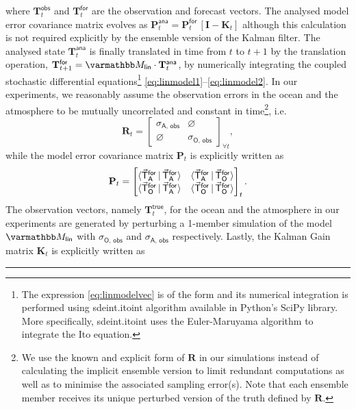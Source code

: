 \documentclass[a4paper,10pt]{article}
\begin{document}
\begin{multicols}{2}
{\noindent}where $\mathbf{T}_t^\mathsf{obs}$ and $\mathbf{T}_t^\mathsf{for}$ are the observation and forecast vectors. The analysed model error covariance matrix evolves as $\mathbf{P}_t^\mathsf{ana} = \mathbf{P}_t^\mathsf{for}\,[\mathbf{I} - \mathbf{K}_t]$ although this calculation is not required explicitly by the ensemble version of the Kalman filter. The analysed state $\mathbf{T}_t^\mathsf{ana}$ is finally translated in time from $t$ to $t + 1$ by the translation operation, $\mathbf{T}_{t+1}^\mathsf{for} = \mlin \cdot \mathbf{T}_{t}^\mathsf{ana}$, by numerically integrating the coupled stochastic differential equations\footnote{The expression \eqref{eq:linmodelvec} is of the  form and its numerical integration is performed using \textsf{sdeint}.\textsf{itoint} algorithm available in Python's \textsf{SciPy} library. More specifically, \textsf{sdeint}.\textsf{itoint} uses the Euler-Maruyama algorithm to integrate the Ito equation.}  \eqref{eq:linmodel1}--\eqref{eq:linmodel2}. In our experiments, we reasonably assume the observation errors in the ocean and the atmosphere to be mutually uncorrelated and constant in time\footnote{We use the known and explicit form of $\mathbf{R}$ in our simulations instead of calculating the implicit ensemble version to limit redundant computations as well as to minimise the associated sampling error(s). Note that each ensemble member receives its unique perturbed version of the truth defined by $\mathbf{R}$.}, i.e.
\begin{equation}
\mathbf{R}_t = 
\begin{bmatrix}
    \sigma_{\mathsf{A},\,\mathsf{obs}} & \varnothing \\
    \varnothing & \sigma_{\mathsf{O},\,\mathsf{obs}}
\end{bmatrix}_{\forall t},
\label{eq:R}
\end{equation}
while the model error covariance matrix $\mathbf{P}_t$ is explicitly written as 
\begin{equation}
\mathbf{P}_t = 
\begin{bmatrix}
    \langle\vec{\mathsf{T}}_\mathsf{A}^\mathsf{for}\,|\,\vec{\mathsf{T}}_\mathsf{A}^\mathsf{for}\rangle & \langle\vec{\mathsf{T}}_\mathsf{A}^\mathsf{for}\,|\,\vec{\mathsf{T}}_\mathsf{O}^\mathsf{for}\rangle \\
    \langle\vec{\mathsf{T}}_\mathsf{O}^\mathsf{for}\,|\,\vec{\mathsf{T}}_\mathsf{A}^\mathsf{for}\rangle & \langle\vec{\mathsf{T}}_\mathsf{O}^\mathsf{for}\,|\,\vec{\mathsf{T}}_\mathsf{O}^\mathsf{for}\rangle
\end{bmatrix}_t.
\label{eq:P}
\end{equation}
The  observation vectors, namely $\mathbf{T}_{t}^\mathsf{true}$, for the ocean and the atmosphere in our experiments are generated by perturbing a 1-member simulation of the model $\mlin$ with $\sigma_{\mathsf{O},\,\mathsf{obs}}$ and $\sigma_{\mathsf{A},\,\mathsf{obs}}$ respectively. Lastly, the Kalman Gain matrix $\mathbf{K}_t$ is explicitly written as 
\noindent\rule{\columnwidth}{0.4pt}
\end{multicols}
\end{document}
